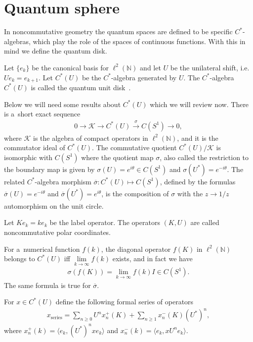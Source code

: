 \documentclass[pdftex]{sigma}
\numberwithin{equation}{section}
\begin{document}
\section{Quantum sphere}\label{Section3}

In noncommutative geometry the quantum spaces are def\/ined to be specif\/ic $C^*$-algebras, which play the role of the
spaces of continuous functions.
With this in mind we def\/ine the quantum disk.

\begin{defin}
Let $\{e_k\}$ be the canonical basis for $\ell^2({\mathbb N})$ and let $U$ be the unilateral shift, i.e.
$Ue_k = e_{k+1}$.
Let $C^*(U)$ be the $C^*$-algebra generated by $U$.
The $C^*$-algebra $C^*(U)$ is called the quantum unit disk~\cite{KL}.
\end{defin}

Below we will need some results about $C^*(U)$ which we will review now.
There is a~short exact sequence
\begin{gather*}
0\longrightarrow \mathcal{K} \longrightarrow C^*(U) \overset{\sigma}{\longrightarrow} C(S^1) \longrightarrow 0,
\end{gather*}
where $ \mathcal{K} $ is the algebra of compact operators in $\ell^2({\mathbb N})$, and it is the commutator ideal of
$C^*(U)$.
The commutative quotient $C^*(U)/\mathcal{K}$ is isomorphic with $C(S^1)$ where the quotient map $\sigma$, also called
the restriction to the boundary map is given by $\sigma(U)= e^{i\theta}\in C(S^1) $ and $\sigma(U^*)=e^{-i\theta}$.
The related $C^*$-algebra morphism $\overline{\sigma}:C^*(U)\mapsto C(S^1)$, def\/ined by the formulas
$\overline{\sigma}(U)=e^{-i\theta}$ and $\overline{\sigma}(U^*) = e^{i\theta}$, is the composition of $\sigma$ with the
$z\to 1/z$ automorphism on the unit circle.

Let $Ke_k = ke_k$ be the label operator.
The operators $(K,U)$ are called noncommutative polar coordinates.

For a~numerical function $f(k)$, the diagonal operator $f(K)$ in $\ell^2({\mathbb N})$ belongs to $C^*(U)$ if\/f
$\lim\limits_{k\to\infty}f(k)$ exists, and in fact we have
\begin{gather*}
\sigma(f(K))=\lim_{k\to\infty}f(k)I\in C(S^1).
\end{gather*}
The same formula is true for $\overline{\sigma}$.

For $x\in C^*(U)$ def\/ine the following formal series of operators
\begin{gather*}
x_\textrm{series} = \sum\limits_{n\ge0} U^n x_n^+(K) + \sum\limits_{n\ge1} x_n^-(K)(U^*)^n,
\end{gather*}
where $x_n^+(k) = \langle e_k, (U^*)^nx e_k\rangle$ and $x_n^-(k) = \langle e_k, xU^n e_k\rangle$.
\end{document}
